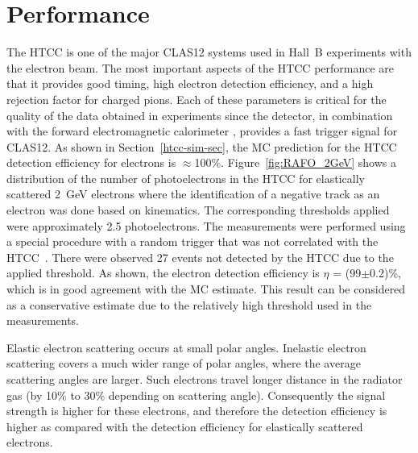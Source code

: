 \section{Performance}

The HTCC is one of the major CLAS12 systems used in Hall~B experiments with the electron beam. The most
important aspects of the HTCC performance are that it provides good timing, high electron detection efficiency,
and a high rejection factor for charged pions. Each of these parameters is critical for the quality of the data
obtained in experiments since the detector, in combination with the forward electromagnetic calorimeter
\cite{ec-nim}, provides a fast trigger signal for CLAS12. As shown in Section~\ref{htcc-sim-sec}, the MC prediction
for the HTCC detection efficiency for electrons is $\approx$100\%. Figure~\ref{fig:RAFO_2GeV} shows a
distribution of the number of photoelectrons in the HTCC for elastically scattered 2~GeV electrons where the
identification of a negative track as an electron was done based on kinematics. The corresponding thresholds applied
were approximately 2.5 photoelectrons. The measurements were performed using a special procedure with a random
trigger that was not correlated with the HTCC~\cite{trigger-nim}. There were observed 27 events not detected by
the HTCC due to the applied threshold. As shown, the electron detection efficiency is $\eta$ = (99$\pm$0.2)\%,
which is in good agreement with the MC estimate. This result can be considered as a conservative estimate due to
the relatively high threshold used in the measurements.

Elastic electron scattering occurs  at small polar angles.  Inelastic electron scattering covers a much wider range of
polar angles, where the average scattering angles are larger. Such electrons travel longer distance in the radiator
gas (by 10\% to 30\% depending on scattering angle). Consequently the signal strength is higher for these electrons,
and therefore the detection efficiency is higher as compared with the detection efficiency for elastically scattered
electrons.  

